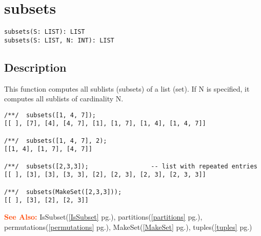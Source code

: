 \documentclass[a4paper]{mybook}
\newenvironment{command}{}{} %
\newcommand\SeeAlso{\par\textcolor{OrangeRed}{\textbf{\large See Also: }}}
\begin{document}
\section{subsets}
\label{subsets}
\begin{command} %


\begin{Verbatim}[label=syntax, rulecolor=\color{MidnightBlue},
frame=single]
subsets(S: LIST): LIST
subsets(S: LIST, N: INT): LIST
\end{Verbatim}


\subsection*{Description}

This function computes all sublists (subsets) of a list (set).
If N is specified, it computes all sublists of cardinality N.
\begin{Verbatim}[label=example, rulecolor=\color{PineGreen}, frame=single]
/**/  subsets([1, 4, 7]);
[[ ], [7], [4], [4, 7], [1], [1, 7], [1, 4], [1, 4, 7]]

/**/  subsets([1, 4, 7], 2);
[[1, 4], [1, 7], [4, 7]]

/**/  subsets([2,3,3]);                 -- list with repeated entries
[[ ], [3], [3], [3, 3], [2], [2, 3], [2, 3], [2, 3, 3]]

/**/  subsets(MakeSet([2,3,3]));
[[ ], [3], [2], [2, 3]]
\end{Verbatim}


\SeeAlso %
  IsSubset(\ref{IsSubset} pg.\pageref{IsSubset}), 
    partitions(\ref{partitions} pg.\pageref{partitions}), 
    permutations(\ref{permutations} pg.\pageref{permutations}), 
    MakeSet(\ref{MakeSet} pg.\pageref{MakeSet}), 
    tuples(\ref{tuples} pg.\pageref{tuples})
\end{command} %
\end{document}
